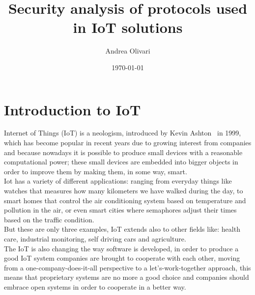 \documentclass[12pt]{report}
\title{\textbf{Security analysis of protocols used in IoT solutions}}
\author{Andrea Olivari}
\date{\today}
\begin{document}
\maketitle
\tableofcontents{}


\chapter{Introduction to IoT}
\bigskip
Internet of Things (IoT) is a neologism, introduced by Kevin Ashton~\cite{kevinashton} in 1999, which has become popular in recent years due to
growing interest from companies and because nowadays it is possible to produce small devices with a reasonable computational power;
these small devices are embedded into bigger objects in order to improve them by making them, in some way, smart.\\

Iot has a variety of different applications: ranging from everyday things like watches that measures how many kilometers we have walked during the day, to smart homes that control the air conditioning system based on temperature and pollution in the air, or even smart cities where semaphores adjust their times based on the traffic condition.\\
But these are only three examples, IoT extends also to other fields like: health care, industrial monitoring, self driving cars and agriculture.\\

The IoT is also changing the way software is developed, in order to produce a good IoT system companies are brought to cooperate with each other,
moving from a one-company-does-it-all perspective to a let’s-work-together approach\cite{successiot}, this means that proprietary systems 
are no more a good choice and companies should embrace open systems in order to cooperate in a better way.\\
\end{document}
